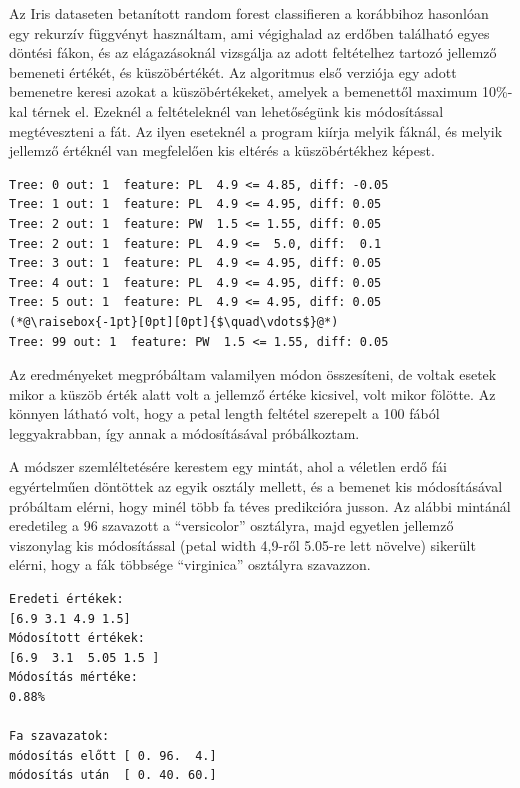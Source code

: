 Az Iris dataseten betanított random forest classifieren a korábbihoz hasonlóan egy rekurzív függvényt használtam, ami végighalad az erdőben található egyes döntési fákon, és az elágazásoknál vizsgálja az adott feltételhez tartozó jellemző bemeneti értékét, és küszöbértékét. Az algoritmus első verziója egy adott bemenetre keresi azokat a küszöbértékeket, amelyek a bemenettől maximum 10\%-kal térnek el. Ezeknél a feltételeknél van lehetőségünk kis módosítással megtéveszteni a fát. Az ilyen eseteknél a program kiírja melyik fáknál, és melyik jellemző értéknél van megfelelően kis eltérés a küszöbértékhez képest.

\begin{lstlisting}[caption={A döntési azon elágazási pontjai, amelyek kis jellezőmódosítással átbillenthetőek.}]
Tree: 0 out: 1  feature: PL  4.9 <= 4.85, diff: -0.05
Tree: 1 out: 1  feature: PL  4.9 <= 4.95, diff: 0.05
Tree: 2 out: 1  feature: PW  1.5 <= 1.55, diff: 0.05
Tree: 2 out: 1  feature: PL  4.9 <=  5.0, diff:  0.1
Tree: 3 out: 1  feature: PL  4.9 <= 4.95, diff: 0.05
Tree: 4 out: 1  feature: PL  4.9 <= 4.95, diff: 0.05
Tree: 5 out: 1  feature: PL  4.9 <= 4.95, diff: 0.05
(*@\raisebox{-1pt}[0pt][0pt]{$\quad\vdots$}@*)
Tree: 99 out: 1  feature: PW  1.5 <= 1.55, diff: 0.05
\end{lstlisting}

Az eredményeket megpróbáltam valamilyen módon összesíteni, de voltak esetek mikor a küszöb érték alatt volt a jellemző értéke kicsivel, volt mikor fölötte. Az könnyen látható volt, hogy a petal length feltétel szerepelt a 100 fából leggyakrabban, így annak a módosításával próbálkoztam.

A módszer szemléltetésére kerestem egy mintát, ahol a véletlen erdő fái egyértelműen döntöttek az egyik osztály mellett, és a bemenet kis módosításával próbáltam elérni, hogy minél több fa téves predikcióra jusson. Az alábbi mintánál eredetileg a 96 szavazott a ``versicolor'' osztályra, majd egyetlen jellemző viszonylag kis módosítással (petal width 4,9-ről 5.05-re lett növelve) sikerült elérni, hogy a fák többsége ``virginica'' osztályra szavazzon.

\begin{lstlisting}[caption={A véletlen erdő kimenetének manipulációja.}]
Eredeti értékek:
[6.9 3.1 4.9 1.5]
Módosított értékek:
[6.9  3.1  5.05 1.5 ]
Módosítás mértéke:
0.88%

Fa szavazatok:
módosítás előtt [ 0. 96.  4.]
módosítás után  [ 0. 40. 60.]
\end{lstlisting}

